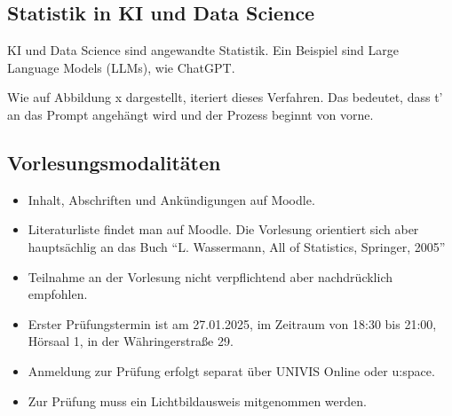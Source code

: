 \documentclass[12pt, a4paper]{article}
\begin{document}
\newpage

    \subsection{Statistik in KI und Data Science}
        KI und Data Science sind angewandte Statistik. Ein Beispiel sind Large Language Models (LLMs),
        wie ChatGPT.

        Wie auf Abbildung x dargestellt, iteriert dieses Verfahren. Das bedeutet, dass t' an das Prompt
        angehängt wird und der Prozess beginnt von vorne.

    \subsection{Vorlesungsmodalitäten}
        \begin{itemize}
            \item Inhalt, Abschriften und Ankündigungen auf Moodle.
            \item Literaturliste findet man auf Moodle. Die Vorlesung orientiert sich aber hauptsächlig an das Buch ``L. Wassermann, All of Statistics, Springer, 2005''
            \item Teilnahme an der Vorlesung nicht verpflichtend aber nachdrücklich empfohlen.
            \item Erster Prüfungstermin ist am 27.01.2025, im Zeitraum von 18:30 bis 21:00, Hörsaal 1, in der Währingerstraße 29.
            \item Anmeldung zur Prüfung erfolgt separat über UNIVIS Online oder u:space.
            \item Zur Prüfung muss ein Lichtbildausweis mitgenommen werden.
        \end{itemize}
\end{document}
